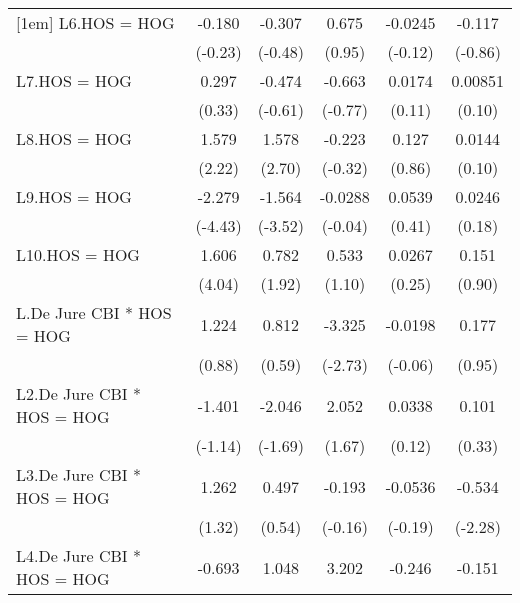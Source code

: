 {\begin{longtable}{l*{5}{c}}
[1em]
L6.HOS = HOG    &   -0.180         &   -0.307         &    0.675         &  -0.0245         &   -0.117         \\
                &  (-0.23)         &  (-0.48)         &   (0.95)         &  (-0.12)         &  (-0.86)         \\
[1em]
L7.HOS = HOG    &    0.297         &   -0.474         &   -0.663         &   0.0174         &  0.00851         \\
                &   (0.33)         &  (-0.61)         &  (-0.77)         &   (0.11)         &   (0.10)         \\
[1em]
L8.HOS = HOG    &    1.579\sym{*}  &    1.578\sym{**} &   -0.223         &    0.127         &   0.0144         \\
                &   (2.22)         &   (2.70)         &  (-0.32)         &   (0.86)         &   (0.10)         \\
[1em]
L9.HOS = HOG    &   -2.279\sym{***}&   -1.564\sym{***}&  -0.0288         &   0.0539         &   0.0246         \\
                &  (-4.43)         &  (-3.52)         &  (-0.04)         &   (0.41)         &   (0.18)         \\
[1em]
L10.HOS = HOG   &    1.606\sym{***}&    0.782         &    0.533         &   0.0267         &    0.151         \\
                &   (4.04)         &   (1.92)         &   (1.10)         &   (0.25)         &   (0.90)         \\
[1em]
L.De Jure CBI * HOS = HOG&    1.224         &    0.812         &   -3.325\sym{**} &  -0.0198         &    0.177         \\
                &   (0.88)         &   (0.59)         &  (-2.73)         &  (-0.06)         &   (0.95)         \\
[1em]
L2.De Jure CBI * HOS = HOG&   -1.401         &   -2.046         &    2.052         &   0.0338         &    0.101         \\
                &  (-1.14)         &  (-1.69)         &   (1.67)         &   (0.12)         &   (0.33)         \\
[1em]
L3.De Jure CBI * HOS = HOG&    1.262         &    0.497         &   -0.193         &  -0.0536         &   -0.534\sym{*}  \\
                &   (1.32)         &   (0.54)         &  (-0.16)         &  (-0.19)         &  (-2.28)         \\
[1em]
L4.De Jure CBI * HOS = HOG&   -0.693         &    1.048         &    3.202\sym{*}  &   -0.246         &   -0.151         \\

\end{longtable}}
